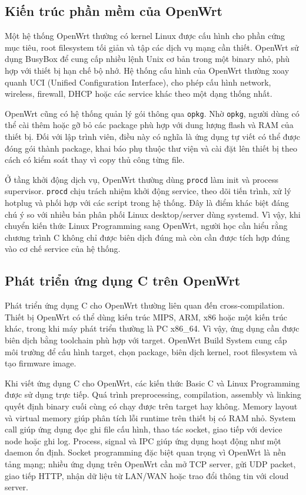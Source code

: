 \documentclass[11pt]{article}
\newcommand{\code}[1]{\texttt{#1}}
\begin{document}
\subsection{Kiến trúc phần mềm của OpenWrt}

Một hệ thống OpenWrt thường có kernel Linux được cấu hình cho phần cứng mục tiêu, root filesystem tối giản và tập các dịch vụ mạng cần thiết. OpenWrt sử dụng BusyBox để cung cấp nhiều lệnh Unix cơ bản trong một binary nhỏ, phù hợp với thiết bị hạn chế bộ nhớ. Hệ thống cấu hình của OpenWrt thường xoay quanh UCI (Unified Configuration Interface), cho phép cấu hình network, wireless, firewall, DHCP hoặc các service khác theo một dạng thống nhất.

OpenWrt cũng có hệ thống quản lý gói thông qua \code{opkg}. Nhờ \code{opkg}, người dùng có thể cài thêm hoặc gỡ bỏ các package phù hợp với dung lượng flash và RAM của thiết bị. Đối với lập trình viên, điều này có nghĩa là ứng dụng tự viết có thể được đóng gói thành package, khai báo phụ thuộc thư viện và cài đặt lên thiết bị theo cách có kiểm soát thay vì copy thủ công từng file.

Ở tầng khởi động dịch vụ, OpenWrt thường dùng \code{procd} làm init và process supervisor. \code{procd} chịu trách nhiệm khởi động service, theo dõi tiến trình, xử lý hotplug và phối hợp với các script trong hệ thống. Đây là điểm khác biệt đáng chú ý so với nhiều bản phân phối Linux desktop/server dùng systemd. Vì vậy, khi chuyển kiến thức Linux Programming sang OpenWrt, người học cần hiểu rằng chương trình C không chỉ được biên dịch đúng mà còn cần được tích hợp đúng vào cơ chế service của hệ thống.

\subsection{Phát triển ứng dụng C trên OpenWrt}

Phát triển ứng dụng C cho OpenWrt thường liên quan đến cross-compilation. Thiết bị OpenWrt có thể dùng kiến trúc MIPS, ARM, x86 hoặc một kiến trúc khác, trong khi máy phát triển thường là PC x86\_64. Vì vậy, ứng dụng cần được biên dịch bằng toolchain phù hợp với target. OpenWrt Build System cung cấp môi trường để cấu hình target, chọn package, biên dịch kernel, root filesystem và tạo firmware image.

Khi viết ứng dụng C cho OpenWrt, các kiến thức Basic C và Linux Programming được sử dụng trực tiếp. Quá trình preprocessing, compilation, assembly và linking quyết định binary cuối cùng có chạy được trên target hay không. Memory layout và virtual memory giúp phân tích lỗi runtime trên thiết bị có RAM nhỏ. System call giúp ứng dụng đọc ghi file cấu hình, thao tác socket, giao tiếp với device node hoặc ghi log. Process, signal và IPC giúp ứng dụng hoạt động như một daemon ổn định. Socket programming đặc biệt quan trọng vì OpenWrt là nền tảng mạng; nhiều ứng dụng trên OpenWrt cần mở TCP server, gửi UDP packet, giao tiếp HTTP, nhận dữ liệu từ LAN/WAN hoặc trao đổi thông tin với cloud server.
\end{document}
